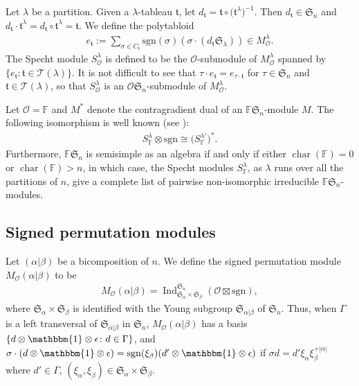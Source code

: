 \documentclass[pdftex]{sigma}
\renewcommand{\t}{\mathfrak{t}}
\newcommand{\TT}{\mathscr{T}}
\newcommand{\sgn}{\mathrm{sgn}}
\newcommand{\Char}{\operatorname{\mathrm{char}}}
\newcommand{\sym}[1]{\mathfrak{S}_{#1}}
\newcommand{\Ind}{\operatorname{\mathrm{Ind}}}
\newcommand{\F}{\mathbb{F}}
\newcommand{\bb}[1]{\mathbbm{{#1}}}
\renewcommand{\O}{\mathcal{O}}
\newcommand{\tlxi}[2]{\xi_{#1}^{+#2}}
\begin{document}
Let $\lambda$ be a partition. Given a $\lambda$-tableau $\t$, let $d_{\t} = \t \circ \big(\t^{\lambda}\big)^{-1}$. Then $d_{\t} \in \sym{n}$ and $d_{\t} \cdot \t^{\lambda} = d_{\t} \circ \t^{\lambda} = \t$. We define the polytabloid \begin{gather*}e_{\t}:=\sum_{\sigma \in C_{\t}} \sgn(\sigma) (\sigma \cdot (d_{\t} \sym{\lambda})) \in M^{\lambda}_{\O}.\end{gather*} The Specht module $S^{\lambda}_{\O}$ is defined to be the $\O$-submodule of $M^{\lambda}_{\O}$ spanned by $ \{ e_{\t} \colon \t \in \TT(\lambda)\}$. It is not difficult to see that $\tau \cdot e_{\t} = e_{\tau \cdot \t}$ for $\tau \in \sym{n}$ and $\t \in \TT(\lambda)$, so that $S^{\lambda}_{\O}$ is an $\O \sym{n}$-submodule of $M^{\lambda}_{\O}$.

Let $\O=\F$ and $M^*$ denote the contragradient dual of an $\F \sym{n}$-module $M$. The following isomorphism is well known (see \cite[Theorem~8.15]{GJ}):
\begin{gather*}S^\lambda_\F\otimes \sgn\cong \big(S^{\lambda'}_\F\big)^*.\end{gather*}
Furthermore, $\F\sym{n}$ is semisimple as an algebra if and only if either $\Char(\F)=0$ or $\Char(\F)>n$, in which case, the Specht modules $S^{\lambda}_\F$, as $\lambda$ runs over all the partitions of $n$, give a complete list of pairwise non-isomorphic irreducible $\F\sym{n}$-modules.

\subsection{Signed permutation modules} \label{S:signedpermutation}

Let $(\alpha|\beta)$ be a bicomposition of $n$. We define the signed permutation module $M_{\O}(\alpha|\beta)$ to be
\begin{gather*}
M_\O(\alpha|\beta) = \Ind_{\sym{\alpha} \times \sym{\beta}}^{\sym{n}} (\O \boxtimes \sgn),
\end{gather*}
where $\sym{\alpha} \times \sym{\beta}$ is identified with the Young subgroup $\sym{\alpha|\beta}$ of $\sym{n}$. Thus, when $\Gamma$ is a left transversal of $\sym{\alpha|\beta}$ in $\sym{n}$, $M_\O(\alpha|\beta)$ has a basis $\{ d \otimes \bb{1} \otimes \epsilon \colon d \in \Gamma \}$, and $\sigma \cdot (d \otimes \bb{1} \otimes \epsilon) = \sgn(\xi_{\beta}) (d' \otimes \bb{1} \otimes \epsilon)$ if $\sigma d = d' \xi_{\alpha} \tlxi{\beta}{|\alpha|}$ where $d' \in \Gamma$, $(\xi_{\alpha}, \xi_{\beta}) \in \sym{\alpha} \times \sym{\beta}$.
\end{document}
